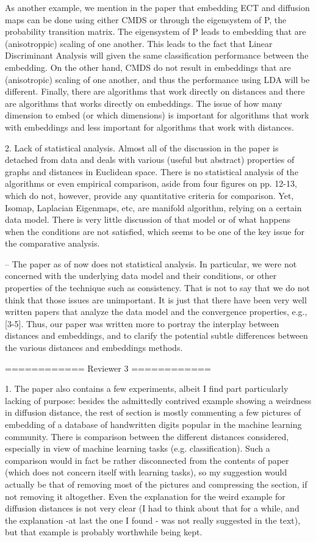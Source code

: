 As another example, we mention in the paper that
embedding ECT and diffusion maps can be done using either CMDS or
through the eigensystem of P, the probability transition matrix. The
eigensystem of P leads to embedding that are (anisotroppic) scaling of
one another. This leads to the fact that Linear Discriminant Analysis
will given the same classification performance between the
embedding. On the other hand, CMDS do not result in embeddings that
are (anisotropic) scaling of one another, and thus the performance
using LDA will be different. Finally, there are algorithms that work
directly on distances and there are algorithms that works directly on
embeddings. The issue of how many dimension to embed (or which
dimensions) is important for algorithms that work with embeddings and
less important for algorithms that work with distances.

2. Lack of statistical
analysis. Almost all of the discussion in the paper is detached from
data and deals with various (useful but abstract) properties of graphs
and distances in Euclidean space.  There is no statistical analysis of
the algorithms or even empirical comparison, aside from four figures
on pp. 12-13, which do not, however, provide any quantitative criteria
for comparison. Yet, Isomap, Laplacian Eigenmaps, etc, are manifold
algorithm, relying on a certain data model. There is very little
discussion of that model or of what happens when the conditions are
not satisfied, which seems to be one of the key issue for the
comparative analysis.

-- The paper as of now does not statistical analysis. In particular,
we were not concerned with the underlying data model and their
conditions, or other properties of the technique such as
consistency. That is not to say that we do not think that those issues
are unimportant. It is just that there have been very well written
papers that analyze the data model and the convergence properties, e.g.,
[3-5]. Thus, our paper was written more to portray the interplay
between distances and embeddings, and to clarify the potential subtle
differences between the various distances and embeddings methods.

============ Reviewer 3 ============ 

1. The paper also contains a few experiments, albeit I find part
particularly lacking of purpose: besides the admittedly contrived
example showing a weirdness in diffusion distance, the rest of section
is mostly commenting a few pictures of embedding of a database of
handwritten digits popular in the machine learning community. There is
comparison between the different distances considered, especially in
view of machine learning tasks (e.g. classification). Such a
comparison would in fact be rather disconnected from the contents of
paper (which does not concern itself with learning tasks), so my
suggestion would actually be that of removing most of the pictures and
compressing the section, if not removing it altogether. Even the
explanation for the weird example for diffusion distances is not very
clear (I had to think about that for a while, and the explanation -at
last the one I found - was not really suggested in the text), but that
example is probably worthwhile being kept.

